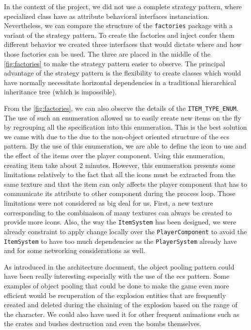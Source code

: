 
In the context of the project, we did not use a complete strategy pattern, where specialized class have as attribute behavioral interfaces instanciation. Nevertheless, we can compare the structure of the \texttt{factories} package with a variant of the strategy pattern. To create the factories and inject confer them different behavior we created three interfaces that would dictate where and how those factories can be used.
The three are placed in the middle of the \autoref{fig:factories} to make the strategy pattern easier to observe. The principal advantage of the strategy pattern is the flexibility to create classes which would have normally necessitate horizontal dependencies in a traditional hierarchical inheritance tree (which is impossible).


From the \autoref{fig:factories}, we can also observe the details of the \texttt{ITEM\_TYPE\_ENUM}. The use of such an enumeration allowed us to easily create new items on the fly by regrouping all the specification into this enumeration. This is the best solution we came with due to the due to the non-object oriented structure of the \gls{ecs} pattern.
By the use of this enumeration, we are able to define the icon to use and the effect of the items over the player component. Using this enumeration, creating item take about 2 minutes. However, this enumeration presents some limitations relatively to the fact that all the icons must be extracted from the same texture and that the item can only affects the player component that has to communicate its attribute to other component during the process loop. Those limitations were not considered as big deal for us. First, a new texture corresponding to the combinaison of many textures can always be created to provide more icons. Also, the way the \texttt{ItemSystem} has been designed, we were already constraint to apply change locally over the \texttt{PlayerComponent} to avoid the \texttt{ItemSystem} to have too much dependencies as the \texttt{PlayerSystem} already have and for some networking considerations as well.

As introduced in the architecture document, the object pooling pattern could have been really interesting especially with the use of the \gls{ecs} pattern. Some examples of object pooling that could be done to make the game even more efficient would be recuperation of the explosion entities that are frequently created and deleted during the chaining of the explosion based on the range of the character. We could also have used it for other frequent animations such as the crates and bushes destruction and even the bombs themselves.

